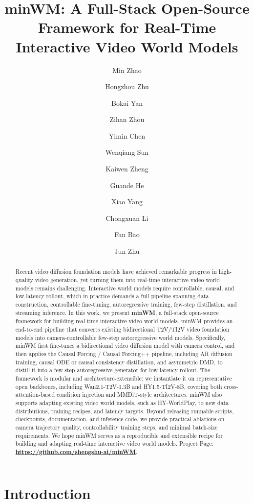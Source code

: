 \documentclass{llmxive}
\title{minWM: A Full-Stack Open-Source Framework for Real-Time Interactive Video World Models}
\author{Min Zhao \and Hongzhou Zhu \and Bokai Yan \and Zihan Zhou \and Yimin Chen \and Wenqiang Sun \and Kaiwen Zheng \and Guande He \and Xiao Yang \and Chongxuan Li \and Fan Bao \and Jun Zhu}
\begin{document}
\maketitle
\begin{abstract}
Recent video diffusion foundation models have achieved remarkable progress in high-quality video generation, yet turning them into real-time interactive video world models remains challenging. Interactive world models require controllable, causal, and low-latency rollout, which in practice demands a full pipeline spanning data construction, controllable fine-tuning, autoregressive training, few-step distillation, and streaming inference. In this work, we present \textbf{minWM}, a full-stack open-source framework for building real-time interactive video world models. minWM provides an end-to-end pipeline that converts existing bidirectional T2V/TI2V video foundation models into camera-controllable few-step autoregressive world models. Specifically, minWM first fine-tunes a bidirectional video diffusion model with camera control, and then applies the Causal Forcing / Causal Forcing++ pipeline, including AR diffusion training, causal ODE or causal consistency distillation, and asymmetric DMD, to distill it into a few-step autoregressive generator for low-latency rollout. The framework is modular and architecture-extensible: we instantiate it on representative open backbones, including Wan2.1-T2V-1.3B and HY1.5-TI2V-8B, covering both cross-attention-based condition injection and MMDiT-style architectures. minWM also supports adapting existing video world models, such as HY-WorldPlay, to new data distributions, training recipes, and latency targets. Beyond releasing runnable scripts, checkpoints, documentation, and inference code, we provide practical ablations on camera trajectory quality, controllability training steps, and minimal batch-size requirements. We hope minWM serves as a reproducible and extensible recipe for building and adapting real-time interactive video world models.
Project Page: \textbf{\href{https://github.com/shengshu-ai/minWM}{https://github.com/shengshu-ai/minWM}}.
\end{abstract}
\section{Introduction}
\end{document}

